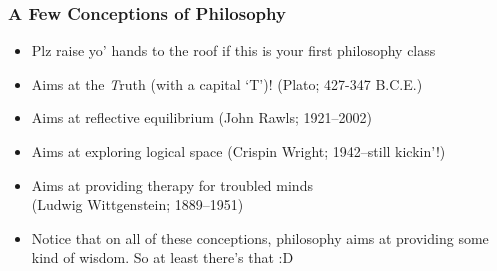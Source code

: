 \begin{frame}
\frametitle{A Few Conceptions of Philosophy}

\begin{itemize}[<+->]

\item Plz raise yo' hands to the roof if this is your first philosophy class

\item Aims at the \emph{T}ruth (with a capital `T')! (Plato; 427-347 B.C.E.)

\item Aims at reflective equilibrium (John Rawls; 1921--2002)

\item Aims at exploring logical space (Crispin Wright; 1942--\footnotesize{still kickin'!})

\item Aims at providing therapy for troubled minds \\ (Ludwig Wittgenstein; 1889--1951)

\item Notice that on all of these conceptions, philosophy aims at providing some kind of wisdom. So at least there's that :D

\end{itemize}
\end{frame}

